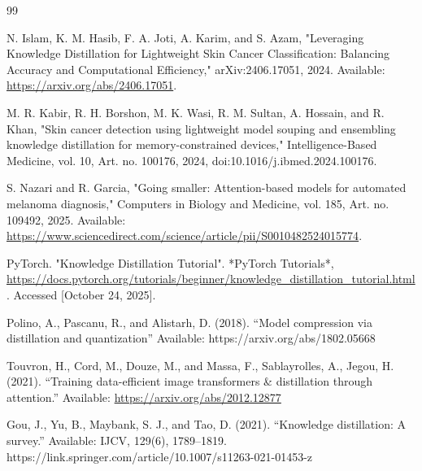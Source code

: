 \documentclass[conference]{IEEEtran}
\begin{document}
\begin{thebibliography}{99}

N. Islam, K. M. Hasib, F. A. Joti, A. Karim, and S. Azam, "Leveraging Knowledge Distillation for Lightweight Skin Cancer Classification: Balancing Accuracy and Computational Efficiency," arXiv:2406.17051, 2024. Available: \url{https://arxiv.org/abs/2406.17051}.

M. R. Kabir, R. H. Borshon, M. K. Wasi, R. M. Sultan, A. Hossain, and R. Khan, "Skin cancer detection using lightweight model souping and ensembling knowledge distillation for memory-constrained devices," Intelligence-Based Medicine, vol. 10, Art. no. 100176, 2024, doi:10.1016/j.ibmed.2024.100176.

S. Nazari and R. Garcia, "Going smaller: Attention-based models for automated melanoma diagnosis," Computers in Biology and Medicine, vol. 185, Art. no. 109492, 2025. Available: \url{https://www.sciencedirect.com/science/article/pii/S0010482524015774}.

PyTorch. "Knowledge Distillation Tutorial". *PyTorch Tutorials*, \url{https://docs.pytorch.org/tutorials/beginner/knowledge_distillation_tutorial.html}. Accessed [October 24, 2025].

Polino, A., Pascanu, R., and Alistarh, D. (2018). “Model compression via distillation and quantization” Available:  https://arxiv.org/abs/1802.05668

Touvron, H., Cord, M., Douze, M., and Massa, F., Sablayrolles, A., Jegou, H. (2021). “Training data-efficient image transformers \& distillation through attention.” Available:  \url{https://arxiv.org/abs/2012.12877}

Gou, J., Yu, B., Maybank, S. J., and Tao, D. (2021). “Knowledge distillation: A survey.” Available: IJCV, 129(6), 1789–1819. https://link.springer.com/article/10.1007/s11263-021-01453-z

\end{thebibliography}
\end{document}
